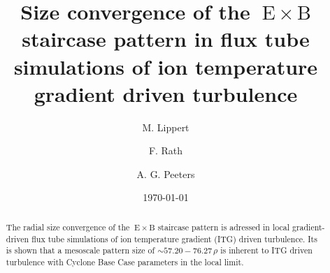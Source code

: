 \documentclass[aip, amsmath, amssymb, reprint, twocolumn, floatfix]{revtex4-1}
\newcommand{\exb}{\mathrm{\:E}\times\mathrm{B}}
\newcommand{\rhoth}{\rho}
\begin{document}

\title[Size convergence of the $\exb$ staircase pattern in flux tube simulations of ion temperature gradient driven turbulence]
{Size convergence of the $\exb$ staircase pattern in flux tube simulations of ion temperature gradient driven turbulence}

\author{M. Lippert}
\author{F. Rath}
\author{A. G. Peeters}

\date{\today}


\begin{abstract}
    The radial size convergence of the $\exb$ staircase pattern is adressed in local gradient-driven flux tube simulations of ion temperature gradient (ITG) driven turbulence.
    Its is shown that a mesoscale pattern size of \linebreak $\sim 57.20-76.27\,\rhoth$ is inherent to ITG driven turbulence with Cyclone Base Case parameters in the local limit. 
    
\end{abstract}

\maketitle



\end{document}
